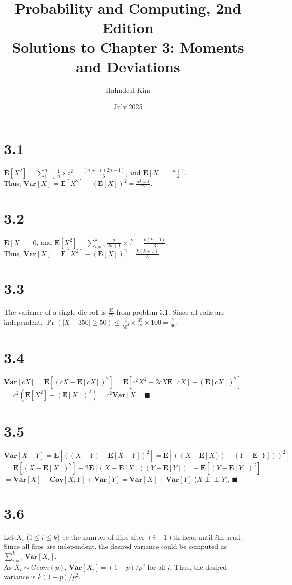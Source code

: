\documentclass{article}
\title {Probability and Computing, 2nd Edition \\[2ex] \large Solutions to Chapter 3: Moments and Deviations}
\author{Hahndeul Kim}
\date{July 2025}
\begin{document}
\maketitle
\newpage
\section*{3.1}
$\textbf{E}[X^2]=\sum\limits_{i=1}^n\frac{1}{n}\times i^2 = \frac{(n+1)(2n+1)}{6}$, and $\textbf{E}[X]=\frac{n+1}{2}$.\\
Thus, $\textbf{Var}[X]=\textbf{E}[X^2]-(\textbf{E}[X])^2=\frac{n^2-1}{12}$.
\section*{3.2}
$\textbf{E}[X]=0$, and $\textbf{E}[X^2]=\sum\limits_{i=1}^k \frac{2}{2k+1} \times i^2 = \frac{k(k+1)}{3}$.\\
Thus, $\textbf{Var}[X]=\textbf{E}[X^2]-(\textbf{E}[X])^2=\frac{k(k+1)}{3}$.
\section*{3.3}
The variance of a single die roll is $\frac{35}{12}$ from problem 3.1.
Since all rolls are independent, $\Pr(|X-350| \geq 50) \leq \frac{1}{50^2}\times \frac{35}{12} \times 100 = \frac{7}{60}$.
\section*{3.4}
$\textbf{Var}[cX]=\textbf{E}[(cX-\textbf{E}[cX])^2]=\textbf{E}[c^2X^2 - 2cX\textbf{E}[cX]+(\textbf{E}[cX])^2]$\\
$=c^2(\textbf{E}[X^2] - (\textbf{E}[X])^2)=c^2\textbf{Var}[X]$. $\blacksquare$
\section*{3.5}
$\textbf{Var}[X-Y]=\textbf{E}[((X-Y)-\textbf{E}[X-Y])^2]=\textbf{E}[((X-\textbf{E}[X])-(Y-\textbf{E}[Y]))^2]$\\
$=\textbf{E}[(X-\textbf{E}[X])^2] - 2\textbf{E}[(X-\textbf{E}[X])(Y-\textbf{E}[Y])]+\textbf{E}[(Y-\textbf{E}[Y])^2]$\\
$=\textbf{Var}[X]-\textbf{Cov}[X,Y]+\textbf{Var}[Y]=\textbf{Var}[X]+\textbf{Var}[Y]$ ($X \perp\!\!\!\perp Y$). $\blacksquare$
\section*{3.6}
Let $X_i$ ($1 \leq i \leq k$) be the number of flips after $(i-1)$th head until $i$th head.
Since all flips are independent, the desired variance could be computed as $\sum\limits_{i=1}^k \textbf{Var}[X_i]$.\\
As $X_i\sim Geom(p)$, $\textbf{Var}[X_i]=(1-p)/p^2$ for all $i$. Thus, the desired variance is $k(1-p)/p^2$.
\end{document}

